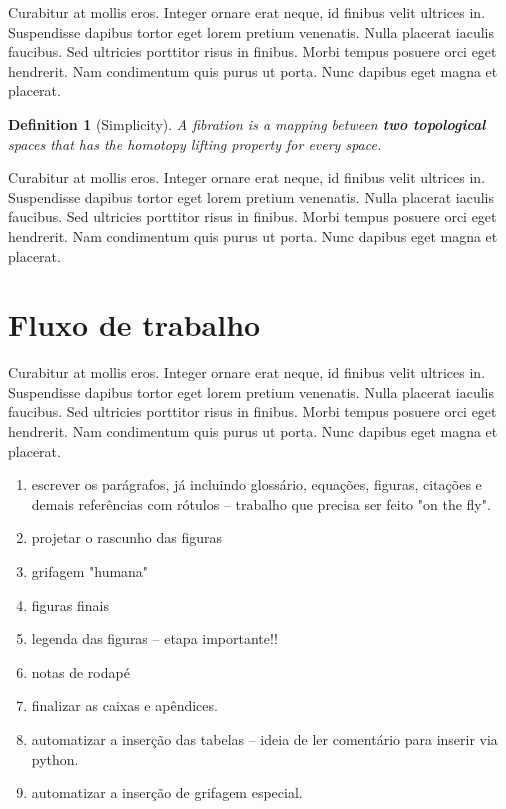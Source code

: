 \documentclass[11pt, a4paper]{report}
\newtheorem{definition}{Definition}[section]
\begin{document}
\par Curabitur at mollis eros. Integer ornare erat neque, id finibus velit ultrices in. Suspendisse dapibus tortor eget lorem pretium venenatis. Nulla placerat iaculis faucibus. Sed ultricies porttitor risus in finibus. Morbi tempus posuere orci eget hendrerit. Nam condimentum quis purus ut porta. Nunc dapibus eget magna et placerat.

\begin{definition}[Simplicity]
A fibration is a mapping between \textbf{two topological} spaces that has the homotopy lifting property for every space.
\end{definition}

\par Curabitur at mollis eros. Integer ornare erat neque, id finibus velit ultrices in. Suspendisse dapibus tortor eget lorem pretium venenatis. Nulla placerat iaculis faucibus. Sed ultricies porttitor risus in finibus. Morbi tempus posuere orci eget hendrerit. Nam condimentum quis purus ut porta. Nunc dapibus eget magna et placerat.

\section{Fluxo de trabalho}

\par Curabitur at mollis eros. Integer ornare erat neque, id finibus velit ultrices in. Suspendisse dapibus tortor eget lorem pretium venenatis. Nulla placerat iaculis faucibus. Sed ultricies porttitor risus in finibus. Morbi tempus posuere orci eget hendrerit. Nam condimentum quis purus ut porta. Nunc dapibus eget magna et placerat.

\begin{enumerate}
\item escrever os parágrafos, já incluindo glossário, equações, figuras, citações e demais referências com rótulos -- trabalho que precisa ser feito "on the fly".
\item projetar o rascunho das figuras
\item grifagem "humana"
\item figuras finais
\item legenda das figuras -- etapa importante!!
\item notas de rodapé
\item finalizar as caixas e apêndices.
\item automatizar a inserção das tabelas -- ideia de ler comentário para inserir via python.
\item automatizar a inserção de grifagem especial.
\end{enumerate}
\end{document}
